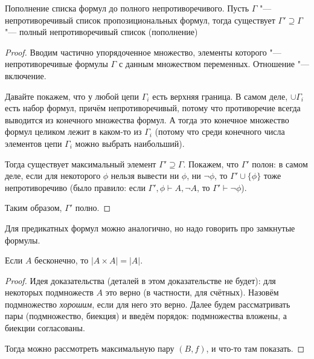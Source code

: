 \begin{exmp}\label{zorn_lemma_exmp_list_full}
	Пополнение списка формул до полного непротиворечивого.
	Пусть $\Gamma$ "--- непротиворечивый список пропозициональных формул,
	тогда существует $\Gamma' \supseteq \Gamma$ "--- полный непротиворечивый список (пополнение)
	\begin{proof}
		Вводим частично упорядоченное множество, элементы которого "--- непротиворечивые формулы $\Gamma$
		с данным множеством переменных.
		Отношение "--- включение.

		Давайте покажем, что у любой цепи $\Gamma_i$ есть верхняя граница.
		В самом деле, $\cup \Gamma_i$ есть набор формул, причём непротиворечивый,
		потому что противоречие всегда выводится из конечного множества формул.
		А тогда это конечное множество формул целиком лежит в каком-то из $\Gamma_i$
		(потому что среди конечного числа элементов цепи $\Gamma_i$ можно выбрать наибольший).

		Тогда существует максимальный элемент $\Gamma' \supseteq \Gamma$.
		Покажем, что $\Gamma'$ полон: в самом деле, если для некоторого $\phi$
		нельзя вывести ни $\phi$, ни $\lnot \phi$, то $\Gamma' \cup \{\phi \}$
		тоже непротиворечиво (было правило: если $\Gamma', \phi \vdash A, \lnot A$, то
		$\Gamma' \vdash \lnot \phi$).

		Таким образом, $\Gamma'$ полно.
	\end{proof}

	Для предикатных формул можно аналогично, но надо говорить про замкнутые формулы.
\end{exmp}

\begin{exmp}
	Если $A$ бесконечно, то $|A \times A| = |A|$.
	\begin{proof}
		Идея доказательства (деталей в этом доказательстве не будет):
		для некоторых подмножеств $A$ это верно (в частности, для счётных).
		Назовём подмножество \textit{хорошим}, если для него это верно.
		Далее будем рассматривать пары (подмножество, биекция) и введём порядок: подмножества вложены,
		а биекции согласованы.

		Тогда можно рассмотреть максимальную пару $(B, f)$, и что-то там показать.
	\end{proof}
\end{exmp}
